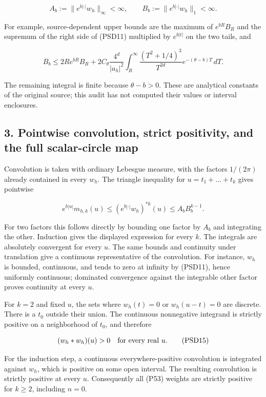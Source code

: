 \[
A_b:=\|e^{b|\cdot|}w_h\|_\infty<\infty,
\qquad B_b:=\|e^{b|\cdot|}w_h\|_1<\infty.
\tag{PSD12}
\]

For example, source-dependent upper bounds are the maximum of \(e^{bR}B_R\) and the supremum of the right side of (PSD11) multiplied by \(e^{b|t|}\) on the two tails, and

\[
B_b\le 2Re^{bR}B_R+
2C_\theta\frac{4^d}{|a_h|^2}
\int_R^\infty\frac{(T^2+1/4)^3}{T^{2d}}
e^{-(\theta-b)T}\,dT.
\tag{PSD13}
\]

The remaining integral is finite because \(\theta-b>0\). These are analytical constants of the original source; this audit has not computed their values or interval enclosures.

\subsection{3. Pointwise convolution, strict positivity, and the full scalar-circle map}\label{pointwise-convolution-strict-positivity-and-the-full-scalar-circle-map}

Convolution is taken with ordinary Lebesgue measure, with the factors \(1/(2\pi)\) already contained in every \(w_h\). The triangle inequality for \(u=t_1+\ldots+t_k\) gives pointwise

\[
e^{b|u|}m_{h,k}(u)
\le(e^{b|\cdot|}w_h)^{*k}(u)
\le A_bB_b^{k-1}.
\tag{PSD14}
\]

For two factors this follows directly by bounding one factor by \(A_b\) and integrating the other. Induction gives the displayed expression for every \(k\). The integrals are absolutely convergent for every \(u\). The same bounds and continuity under translation give a continuous representative of the convolution. For instance, \(w_h\) is bounded, continuous, and tends to zero at infinity by (PSD11), hence uniformly continuous; dominated convergence against the integrable other factor proves continuity at every \(u\).

For \(k=2\) and fixed \(u\), the sets where \(w_h(t)=0\) or \(w_h(u-t)=0\) are discrete. There is a \(t_0\) outside their union. The continuous nonnegative integrand is strictly positive on a neighborhood of \(t_0\), and therefore

\[
(w_h*w_h)(u)>0\quad\hbox{for every real }u.
\tag{PSD15}
\]

For the induction step, a continuous everywhere-positive convolution is integrated against \(w_h\), which is positive on some open interval. The resulting convolution is strictly positive at every \(u\). Consequently all (P53) weights are strictly positive for \(k\ge 2\), including \(n=0\).

